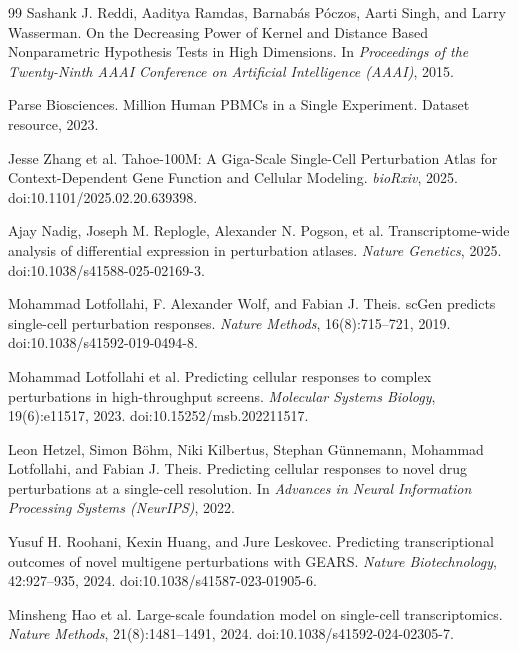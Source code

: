 \documentclass[11pt]{article}
\begin{document}
\begin{thebibliography}{99}
  Sashank J. Reddi, Aaditya Ramdas, Barnab{\'a}s P{\'o}czos, Aarti Singh, and Larry Wasserman.
  \newblock On the Decreasing Power of Kernel and Distance Based Nonparametric Hypothesis Tests in High Dimensions.
  \newblock In \emph{Proceedings of the Twenty-Ninth AAAI Conference on Artificial Intelligence (AAAI)}, 2015.

  Parse Biosciences.
   Million Human PBMCs in a Single Experiment.
  \newblock Dataset resource, 2023.

  Jesse Zhang et al.
  \newblock Tahoe-100M: A Giga-Scale Single-Cell Perturbation Atlas for Context-Dependent Gene Function and Cellular Modeling.
  \newblock \emph{bioRxiv}, 2025.
  \newblock doi:10.1101/2025.02.20.639398.

  Ajay Nadig, Joseph M. Replogle, Alexander N. Pogson, et al.
  \newblock Transcriptome-wide analysis of differential expression in perturbation atlases.
  \newblock \emph{Nature Genetics}, 2025.
  \newblock doi:10.1038/s41588-025-02169-3.

  Mohammad Lotfollahi, F. Alexander Wolf, and Fabian J. Theis.
  \newblock scGen predicts single-cell perturbation responses.
  \newblock \emph{Nature Methods}, 16(8):715--721, 2019.
  \newblock doi:10.1038/s41592-019-0494-8.

  Mohammad Lotfollahi et al.
  \newblock Predicting cellular responses to complex perturbations in high-throughput screens.
  \newblock \emph{Molecular Systems Biology}, 19(6):e11517, 2023.
  \newblock doi:10.15252/msb.202211517.

  Leon Hetzel, Simon B{\"o}hm, Niki Kilbertus, Stephan G{\"u}nnemann,
  Mohammad Lotfollahi, and Fabian J. Theis.
  \newblock Predicting cellular responses to novel drug perturbations at a single-cell resolution.
  \newblock In \emph{Advances in Neural Information Processing Systems (NeurIPS)}, 2022.

  Yusuf H. Roohani, Kexin Huang, and Jure Leskovec.
  \newblock Predicting transcriptional outcomes of novel multigene perturbations with GEARS.
  \newblock \emph{Nature Biotechnology}, 42:927--935, 2024.
  \newblock doi:10.1038/s41587-023-01905-6.

  Minsheng Hao et al.
  \newblock Large-scale foundation model on single-cell transcriptomics.
  \newblock \emph{Nature Methods}, 21(8):1481--1491, 2024.
  \newblock doi:10.1038/s41592-024-02305-7.


\end{thebibliography}
\end{document}
